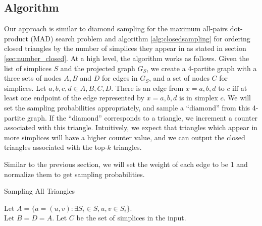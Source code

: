 \documentclass{article}
\begin{document}

\subsection{Algorithm}
Our approach is similar to diamond sampling for the maximum
all-pairs dot-product (MAD) search problem \cite{diamond} and
algorithm \ref{alg:closedsampling} for ordering closed
triangles by the number of simplices they appear in as stated
in section \ref{sec:number_closed}.
At a high level, the algorithm works as follows. Given the list
of simplices $S$ and the projected graph $G_S$, we create a 4-partite
graph with a three sets of nodes $A,B$ and $D$ for edges 
in $G_S$, and a set of nodes $C$ for simplices. Let
$a,b,c,d \in A,B,C,D$. There is an edge from $x = a,b,d$
to $c$ iff at least one endpoint of the edge represented by
$x = a,b,d$ is in simplex $c$.  We will set the sampling probabilities
appropriately, and sample a ``diamond'' from this 4-partite 
graph. If the ``diamond'' corresponds to a triangle, we
increment a counter associated with this triangle. Intuitively,
we expect that triangles which appear in more simplices will have
a higher counter value, and we can output the closed triangles
associated with the top-$k$ triangles.

Similar to the previous section, we will set the weight of each
edge to be 1 and normalize them to get sampling probabilities.

\begin{algorithm}\label{alg:allsampling}
  \caption{Sampling All Triangles}
  Let $A = \{a = (u,v) : \exists S_i \in S, u,v \in S_i \}$.\\
  Let $B = D = A$.
  Let $C$ be the set of simplices in the input.\\
\end{algorithm}
\end{document}
